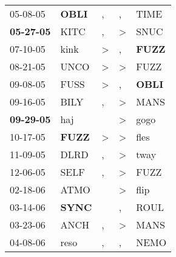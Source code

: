 \begin{supertabular}{p{0.07\textwidth}p{0.06\textwidth}p{0.02\textwidth}p{0.02\textwidth}p{0.06\textwidth}}
          05-08-05\textsuperscript{} &  \textbf{OBLI\textsuperscript{}} &                , &                , &           TIME\textsuperscript{} \\
 \textbf{05-27-05\textsuperscript{}} &           KITC\textsuperscript{} &                , &     \textgreater &           SNUC\textsuperscript{} \\
          07-10-05\textsuperscript{} &           kink\textsuperscript{} &     \textgreater &                , &  \textbf{FUZZ\textsuperscript{}} \\
          08-21-05\textsuperscript{} &           UNCO\textsuperscript{} &     \textgreater &     \textgreater &           FUZZ\textsuperscript{} \\
          09-08-05\textsuperscript{} &           FUSS\textsuperscript{} &     \textgreater &                , &  \textbf{OBLI\textsuperscript{}} \\
          09-16-05\textsuperscript{} &           BILY\textsuperscript{} &                , &     \textgreater &           MANS\textsuperscript{} \\
 \textbf{09-29-05\textsuperscript{}} &            haj\textsuperscript{} &                  &     \textgreater &           gogo\textsuperscript{} \\
          10-17-05\textsuperscript{} &  \textbf{FUZZ\textsuperscript{}} &     \textgreater &     \textgreater &           fles\textsuperscript{} \\
          11-09-05\textsuperscript{} &           DLRD\textsuperscript{} &                , &     \textgreater &           tway\textsuperscript{} \\
          12-06-05\textsuperscript{} &           SELF\textsuperscript{} &                , &     \textgreater &           FUZZ\textsuperscript{} \\
          02-18-06\textsuperscript{} &           ATMO\textsuperscript{} &                  &     \textgreater &           flip\textsuperscript{} \\
          03-14-06\textsuperscript{} &  \textbf{SYNC\textsuperscript{}} &                  &                , &           ROUL\textsuperscript{} \\
          03-23-06\textsuperscript{} &           ANCH\textsuperscript{} &                , &     \textgreater &           MANS\textsuperscript{} \\
          04-08-06\textsuperscript{} &           reso\textsuperscript{} &                , &                , &           NEMO\textsuperscript{} \\

\end{supertabular}
